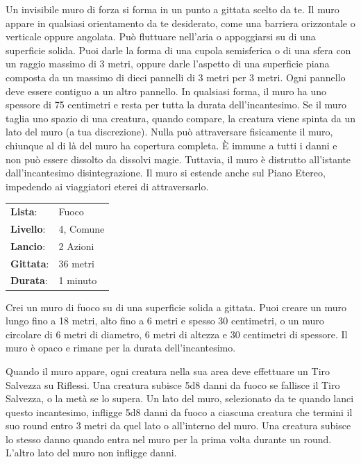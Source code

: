 \begin{multicols}{2}
Un invisibile muro di forza si forma in un punto a gittata scelto da te. Il muro appare in qualsiasi orientamento da te desiderato, come una barriera orizzontale o verticale oppure angolata. Può fluttuare nell'aria o appoggiarsi su di una superficie solida. Puoi darle la forma di una cupola semisferica o di una sfera con un raggio massimo di 3 metri, oppure darle l'aspetto di una superficie piana composta da un massimo di dieci pannelli di 3 metri per 3 metri. Ogni pannello deve essere contiguo a un altro pannello. In qualsiasi forma, il muro ha uno spessore di 75 centimetri e resta per tutta la durata dell'incantesimo. Se il muro taglia uno spazio di una creatura, quando compare, la creatura viene spinta da un lato del muro (a tua discrezione). Nulla può attraversare fisicamente il muro, chiunque al di là del muro ha copertura completa. È immune a tutti i danni e non può essere dissolto da dissolvi magie. Tuttavia, il muro è distrutto all'istante dall'incantesimo disintegrazione. Il muro si estende anche sul Piano Etereo, impedendo ai viaggiatori eterei di attraversarlo.

\noindent\begin{tabularx}{\linewidth}{p{1.3cm}X}
	\rowcolor{gray!20}\textbf{Lista}: & Fuoco \\
	\textbf{Livello}: & 4, Comune \\
	\rowcolor{gray!20}\textbf{Lancio}: & 2 Azioni \\
	\textbf{Gittata}: & 36 metri \\
	\rowcolor{gray!20}\textbf{Durata}: & 1 minuto \\
\end{tabularx}\smallskip

Crei un muro di fuoco su di una superficie solida a gittata. Puoi creare un muro lungo fino a 18 metri, alto fino a 6 metri e spesso 30 centimetri, o un muro circolare di 6 metri di diametro, 6 metri di altezza e 30 centimetri di spessore. Il muro è opaco e rimane per la durata dell'incantesimo.

Quando il muro appare, ogni creatura nella sua area deve effettuare un Tiro Salvezza su Riflessi. Una creatura subisce 5d8 danni da fuoco se fallisce il Tiro Salvezza, o la metà se lo supera. Un lato del muro, selezionato da te quando lanci questo incantesimo, infligge 5d8 danni da fuoco a ciascuna creatura che termini il suo round entro 3 metri da quel lato o all'interno del muro. Una creatura subisce lo stesso danno quando entra nel muro per la prima volta durante un round. L'altro lato del muro non infligge danni.


\end{multicols}
